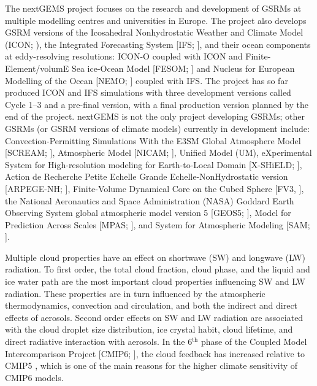 \documentclass[12pt,a4paper]{article}
\begin{document}
The nextGEMS project \citep{nextgems} focuses on the research and development
of GSRMs at multiple modelling centres and universities in Europe. The project
also develops GSRM versions of the Icosahedral Nonhydrostatic Weather and
Climate Model (ICON; \cite{hohenegger2023}), the Integrated Forecasting System
[IFS; \cite{ifs2023}], and their ocean components at eddy-resolving
resolutions: ICON-O \citep{korn2022} coupled with ICON and
Finite-Element/volumE Sea ice-Ocean Model [FESOM; \cite{wang2014}] and Nucleus
for European Modelling of the Ocean [NEMO; \cite{madec2023}] coupled with IFS.
The project has so far produced ICON and IFS simulations with three development
versions called Cycle 1--3 and a pre-final version, with a final production
version planned by the end of the project. nextGEMS is not the only project
developing GSRMs; other GSRMs (or GSRM versions of climate models) currently in
development include: Convection-Permitting Simulations With the E3SM Global
Atmosphere Model [SCREAM; \cite{caldwell2021}], Atmospheric Model [NICAM;
\cite{satoh2008}], Unified Model (UM), eXperimental System for High-resolution
modeling for Earth-to-Local Domain [X-SHiELD; \cite{shield}], Action de
Recherche Petite Echelle Grande Echelle-NonHydrostatic version [ARPEGE-NH;
\cite{bubnova1995,voldoire2017}], Finite-Volume Dynamical Core on the Cubed
Sphere [FV3, \cite{lin2004}], the National Aeronautics and Space Administration
(NASA) Goddard Earth Observing System global atmospheric model version 5
[GEOS5; \cite{putman2011}], Model for Prediction Across Scales [MPAS;
\cite{skamarock2012}], and System for Atmospheric Modeling [SAM;
\cite{khairoutdinov2003}].

Multiple cloud properties have an effect on shortwave (SW) and longwave (LW)
radiation. To first order, the total cloud fraction, cloud phase, and the
liquid and ice water path are the most important cloud properties influencing
SW and LW radiation. These properties are in turn influenced by the
atmospheric thermodynamics, convection and circulation, and both the indirect
and direct effects of aerosols. Second order effects on SW and LW radiation are
associated with the cloud droplet size distribution, ice crystal habit, cloud
lifetime, and direct radiative interaction with aerosols.  In the
6$^\mathrm{th}$ phase of the Coupled Model Intercomparison Project [CMIP6;
\cite{eyring2016}], the cloud feedback has increased relative to CMIP5
\citep{zelinka2020}, which is one of the main reasons for the higher climate
sensitivity of CMIP6 models.
\end{document}
